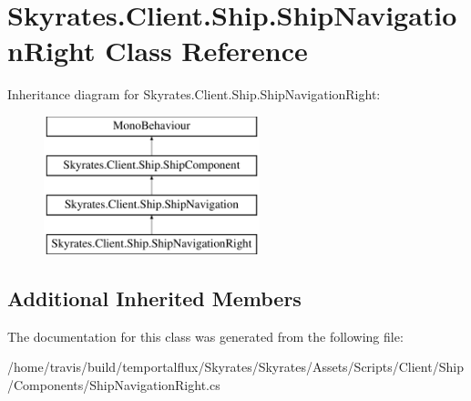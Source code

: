 \hypertarget{class_skyrates_1_1_client_1_1_ship_1_1_ship_navigation_right}{\section{Skyrates.\-Client.\-Ship.\-Ship\-Navigation\-Right Class Reference}
\label{class_skyrates_1_1_client_1_1_ship_1_1_ship_navigation_right}
}
Inheritance diagram for Skyrates.\-Client.\-Ship.\-Ship\-Navigation\-Right\-:\begin{figure}[H]
\begin{center}
\leavevmode
\includegraphics[height=4.000000cm]{class_skyrates_1_1_client_1_1_ship_1_1_ship_navigation_right}
\end{center}
\end{figure}
\subsection*{Additional Inherited Members}


The documentation for this class was generated from the following file\-:\begin{DoxyCompactItemize}
\item 
/home/travis/build/temportalflux/\-Skyrates/\-Skyrates/\-Assets/\-Scripts/\-Client/\-Ship/\-Components/Ship\-Navigation\-Right.\-cs\end{DoxyCompactItemize}
